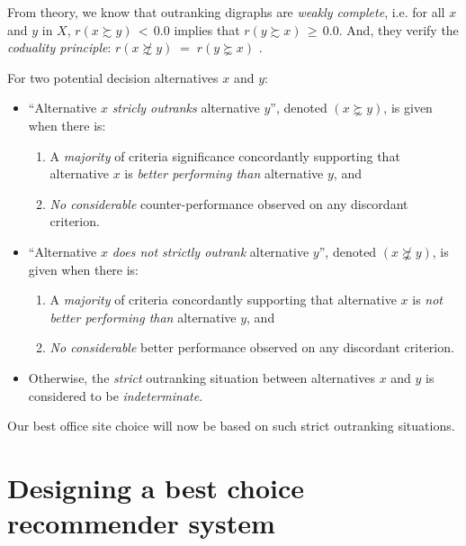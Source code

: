 From theory, we know that outranking digraphs are \emph{weakly complete}, i.e. for all $x$ and $y$ in $X$, $r(x \succsim y)\, <\, 0.0$ implies that $r(y \succsim x)\, \geq\, 0.0$. And, they verify the \emph{coduality principle}:  $r(x \not\succsim y) \;=\; r(y \succnsim x)$ \citep{BIS-2013}. 
\begin{definition}\label{def:strictOutranking}

\noindent For two potential decision alternatives $x$ and $y$:
\begin{itemize}[leftmargin=0.5cm,rightmargin=0.5cm]
\item ``Alternative $x$ \emph{stricly outranks} alternative $y$'', denoted $(x \succnsim y)$, is given when there is:
   \begin{enumerate}
     \item A \emph{majority} of criteria significance concordantly supporting that alternative $x$ is \emph{better performing than} alternative $y$, and
     \item \emph{No considerable} counter-performance observed on any discordant criterion.      
    \end{enumerate}
\item ``Alternative $x$ \emph{does not strictly outrank} alternative $y$'', denoted $(x \not\succnsim y)$, is given when there is:
   \begin{enumerate}
    \item A \emph{majority} of criteria concordantly supporting that alternative $x$ is \emph{not better performing than} alternative $y$, and
    \item \emph{No considerable} better performance observed on any discordant criterion. 
    \end{enumerate}
\item Otherwise, the \emph{strict} outranking situation between alternatives $x$ and $y$ is considered to be \emph{indeterminate}.
\end{itemize}
\end{definition}

Our best office site choice will now be based on such strict outranking situations.

\section{Designing a best choice recommender system}
\label{sec:4.3}

